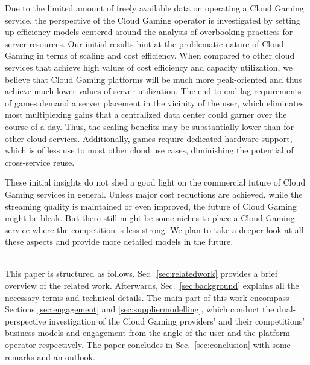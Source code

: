 Due to the limited amount of freely available data on operating a Cloud 
Gaming service, the perspective of the Cloud Gaming operator is 
investigated by setting up efficiency models centered around the analysis of 
overbooking practices for server resources. Our initial results hint at the problematic 
nature of Cloud Gaming in terms of scaling and cost efficiency. When 
compared to other cloud services that achieve high values of cost 
efficiency and capacity utilization, we believe that Cloud Gaming 
platforms will be much more peak-oriented and thus achieve much 
lower values of server utilization. The end-to-end lag requirements of 
games demand a server placement in the vicinity of the user, which 
eliminates most multiplexing gains that a centralized data center could 
garner over the course of a day. Thus, the scaling benefits may be substantially lower than for other cloud services. Additionally, games require dedicated 
hardware support, which is of less use to most other cloud use 
cases, diminishing the potential of cross-service reuse.

These initial insights do not shed a good light on the commercial 
future of Cloud Gaming services in general. Unless major cost reductions 
are achieved, while the streaming quality is maintained or even improved, 
the future of Cloud Gaming might be bleak. But there still 
might be some niches to place a Cloud Gaming service where the 
competition is less strong. We plan to take a deeper look at all these 
aspects and provide more detailed models in the future.

~\\
This paper is structured as follows. Sec.~\ref{sec:relatedwork} 
provides a brief overview of the related work. Afterwards, 
Sec.~\ref{sec:background} explains all the necessary terms and 
technical details. The main part of this work 
encompass Sections \ref{sec:engagement} and 
\ref{sec:suppliermodelling}, which conduct the dual-perspective 
investigation of the Cloud Gaming providers' and their competitions' 
business models and engagement from the angle of the user and the 
platform operator respectively. The paper concludes in 
Sec.~\ref{sec:conclusion} with some remarks and an outlook.


